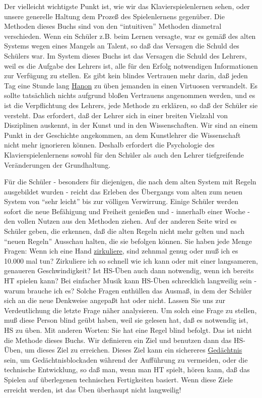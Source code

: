 Der vielleicht wichtigste Punkt ist, wie wir das Klavierspielenlernen sehen, oder unsere generelle Haltung dem Prozeß des Spielenlernens gegenüber.
Die Methoden dieses Buchs sind von den \enquote{intuitiven} Methoden diametral verschieden.
Wenn ein Schüler z.B. beim Lernen versagte, war es gemäß des alten Systems wegen eines Mangels an Talent, so daß das Versagen die Schuld des Schülers war.
Im System dieses Buchs ist das Versagen die Schuld des Lehrers, weil es die Aufgabe des Lehrers ist, alle für den Erfolg notwendigen Informationen zur Verfügung zu stellen.
Es gibt kein blindes Vertrauen mehr darin, daß jeden Tag eine Stunde lang \hyperref[c1iii7h]{Hanon} zu üben jemanden in einen Virtuosen verwandelt.
Es sollte tatsächlich nichts aufgrund bloßen Vertrauens angenommen werden, und es ist die Verpflichtung des Lehrers, jede Methode zu erklären, so daß der Schüler sie versteht.
Das erfordert, daß der Lehrer sich in einer breiten Vielzahl von Disziplinen auskennt, in der Kunst und in den Wissenschaften.
Wir sind an einem Punkt in der Geschichte angekommen, an dem Kunstlehrer die Wissenschaft nicht mehr ignorieren können.
Deshalb erfordert die Psychologie des Klavierspielenlernens sowohl für den Schüler als auch den Lehrer tiefgreifende Veränderungen der Grundhaltung.

Für die Schüler - besonders für diejenigen, die nach dem alten System mit Regeln ausgebildet wurden - reicht das Erleben des Übergangs vom alten zum neuen System von \enquote{sehr leicht} bis zur völligen Verwirrung.
Einige Schüler werden sofort die neue Befähigung und Freiheit genießen und - innerhalb einer Woche - den vollen Nutzen aus den Methoden ziehen.
Auf der anderen Seite wird es Schüler geben, die erkennen, daß die alten Regeln nicht mehr gelten und nach \enquote{neuen Regeln} Ausschau halten, die sie befolgen können.
Sie haben jede Menge Fragen: Wenn ich eine Hand \hyperref[c1iii2]{zirkuliere}, sind zehnmal genug oder muß ich es 10.000 mal tun?
Zirkuliere ich so schnell wie ich kann oder mit einer langsameren, genaueren Geschwindigkeit?
Ist HS-Üben auch dann notwendig, wenn ich bereits HT spielen kann?
Bei einfacher Musik kann HS-Üben schrecklich langweilig sein - warum brauche ich es?
Solche Fragen enthüllen das Ausmaß, in dem der Schüler sich an die neue Denkweise angepaßt hat oder nicht.
Lassen Sie uns zur Verdeutlichung die letzte Frage näher analysieren.
Um solch eine Frage zu stellen, muß diese Person blind geübt haben, weil sie gelesen hat, daß es notwendig ist, HS zu üben.
Mit anderen Worten: Sie hat eine Regel blind befolgt.
Das ist nicht die Methode dieses Buchs.
Wir definieren ein Ziel und benutzen dann das HS-Üben, um dieses Ziel zu erreichen.
Dieses Ziel kann ein sichereres \hyperref[c1iii6]{Gedächtnis} sein, um Gedächtnisblockaden während der Aufführung zu vermeiden, oder die technische Entwicklung, so daß man, wenn man HT spielt, hören kann, daß das Spielen auf überlegenen technischen Fertigkeiten basiert.
Wenn diese Ziele erreicht werden, ist das Üben überhaupt nicht langweilig!


